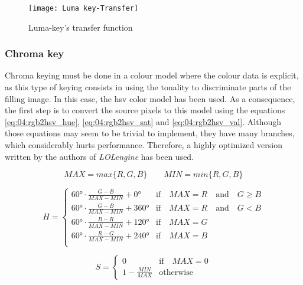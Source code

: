 \documentclass[../main.tex]{subfiles}
\begin{document}
\begin{figure}[htbp]
    \centering
    \texttt{[image: Luma key-Transfer]}

    \caption{Luma-key's transfer function}
    \label{fig:04:lum_transfer_function}
\end{figure}




\subsubsection{Chroma key}
Chroma keying must be done in a colour model where the colour data is explicit, as this type of keying consists in using the tonality to discriminate parts of the filling image. In this case, the \gls{hsv} color model has been used. As a consequence, the first step is to convert the source pixels to this model using the equations \eqref{eq:04:rgb2hsv_hue}, \eqref{eq:04:rgb2hsv_sat} and \eqref{eq:04:rgb2hsv_val}. Although those equations may seem to be trivial to implement, they have many branches, which considerably hurts performance. Therefore, a highly optimized version written by the authors of \textit{LOLengine} has been used\cite{rgb2hsvGlsl}.\newline

\begin{equation*}
    MAX = max\{R, G, B\} \qquad MIN = min\{R, G, B\}
\end{equation*}

\begin{equation}\label{eq:04:rgb2hsv_hue}
    H = 
    \begin{cases}
        60\si{\degree} \cdot \frac{G - B}{MAX - MIN} + 0\si{\degree} & \text{if} \quad MAX=R \quad \text{and} \quad G \geq B \\
        60\si{\degree} \cdot \frac{G - B}{MAX - MIN} + 360\si{\degree} & \text{if} \quad MAX=R \quad \text{and} \quad G < B \\
        60\si{\degree} \cdot \frac{B - R}{MAX - MIN} + 120\si{\degree} & \text{if} \quad MAX=G \\
        60\si{\degree} \cdot \frac{R - G}{MAX - MIN} + 240\si{\degree} & \text{if} \quad MAX=B \\
    \end{cases}
\end{equation}

\begin{equation}\label{eq:04:rgb2hsv_sat}
    S = 
    \begin{cases}
        0 & \text{if} \quad MAX=0 \\
        1 - \frac{MIN}{MAX} & \text{otherwise}
    \end{cases}
\end{equation}
\end{document}
